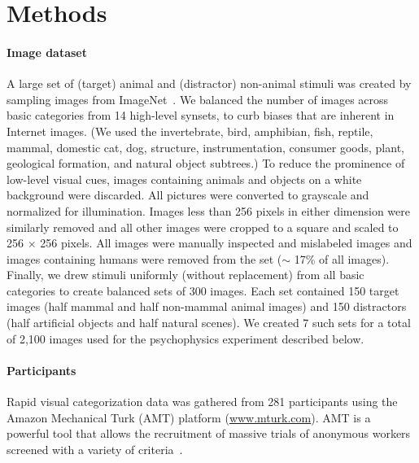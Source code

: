 \documentclass{article}
\begin{document}
\section{Methods}


\paragraph{Image dataset}
A large set of (target) animal and (distractor) non-animal stimuli was created by sampling images from ImageNet~\citep{deng2009imagenet}. We balanced the number of images across basic categories from 14 high-level synsets, to curb biases that are inherent in Internet images. (We used the invertebrate, bird, amphibian, fish, reptile, mammal, domestic cat, dog, structure, instrumentation, consumer goods, plant, geological formation, and natural object subtrees.) To reduce the prominence of low-level visual cues, images containing animals and objects on a white background were discarded. All pictures were converted to grayscale and normalized for illumination. Images less than 256 pixels in either dimension were similarly removed and all other images were cropped to a square and scaled to 256 $\times$ 256 pixels. All images were manually inspected and mislabeled images and images containing humans were removed from the set ($\sim$ 17\% of all images). Finally, we drew stimuli uniformly (without replacement) from all basic categories to create balanced sets of 300 images. Each set contained 150 target images (half mammal and half non-mammal animal images) and 150 distractors (half artificial objects and half natural scenes). We created 7 such sets for a total of 2,100 images used for the psychophysics experiment described below.  



\paragraph{Participants}

Rapid visual categorization data was gathered from 281 participants using the Amazon Mechanical Turk (AMT) platform (\url{www.mturk.com}). AMT is a powerful tool that allows the recruitment of massive trials of anonymous workers screened with a variety of criteria~\citep{Crump2013}. 


\end{document}
